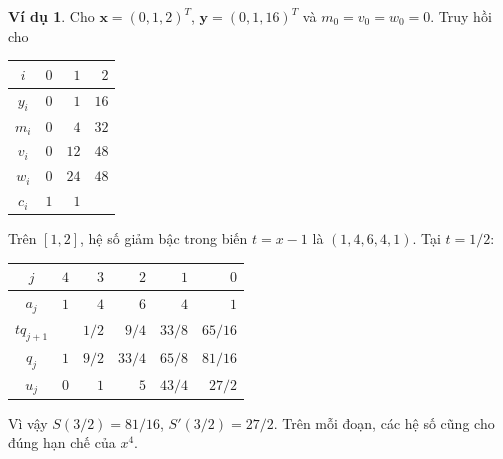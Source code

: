\documentclass[12pt,a4paper,oneside]{book}
\numberwithin{algorithm}{chapter}
\theoremstyle{definition}
\newtheorem{vidu}{Ví dụ}[chapter]
\begin{document}
\begin{vidu}
Cho $\boldsymbol x=(0,1,2)^T$, $\boldsymbol y=(0,1,16)^T$ và $m_0=v_0=w_0=0$. Truy hồi cho
\begin{center}
\begin{tabular}{c|rrr}\toprule
$i$&$0$&$1$&$2$\\\midrule
$y_i$&$0$&$1$&$16$\\
$m_i$&$0$&$4$&$32$\\
$v_i$&$0$&$12$&$48$\\
$w_i$&$0$&$24$&$48$\\
$c_i$&$1$&$1$&\\\bottomrule
\end{tabular}
\end{center}
Trên $[1,2]$, hệ số giảm bậc trong biến $t=x-1$ là $(1,4,6,4,1)$. Tại $t=1/2$:
\begin{center}
\begin{tabular}{c|rrrrr}\toprule
$j$&$4$&$3$&$2$&$1$&$0$\\\midrule
$a_j$&$1$&$4$&$6$&$4$&$1$\\
$t q_{j+1}$&&$1/2$&$9/4$&$33/8$&$65/16$\\
$q_j$&$1$&$9/2$&$33/4$&$65/8$&$\boxed{81/16}$\\
$u_j$&$0$&$1$&$5$&$43/4$&$\boxed{27/2}$\\\bottomrule
\end{tabular}
\end{center}
Vì vậy $S(3/2)=81/16$, $S'(3/2)=27/2$. Trên mỗi đoạn, các hệ số cũng cho đúng hạn chế của $x^4$.
\end{vidu}
\end{document}
